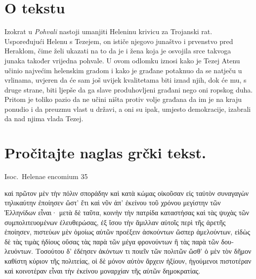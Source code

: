 


\section*{O tekstu}

Izokrat u \textit{Pohvali} nastoji umanjiti Heleninu krivicu za Trojanski rat. Uspoređujući Helenu s Tezejem, on ističe njegovo junaštvo i prvenstvo pred Heraklom, čime želi ukazati na to da je i žena koja je osvojila srce takvoga junaka također vrijedna pohvale. U ovom odlomku iznosi kako je Tezej Atenu učinio najvećim helenskim gradom i kako je građane potaknuo da se natječu u vrlinama, uvjeren da će sam još uvijek kvalitetama biti iznad njih, dok će mu, s druge strane, biti ljepše da ga slave produhovljeni građani nego oni ropskog duha. Pritom je toliko pazio da ne učini ništa protiv volje građana da im je na kraju  ponudio i da preuzmu vlast u državi, a oni su ipak, umjesto demokracije, izabrali da nad njima vlada Tezej.


\section*{Pročitajte naglas grčki tekst.}

Isoc.\ Helenae encomium 35


\medskip

\begin{greek}
{\large

\noindent καὶ πρῶτον μὲν τὴν πόλιν σποράδην καὶ κατὰ κώμας οἰκοῦσαν εἰς ταὐτὸν συναγαγὼν τηλικαύτην ἐποίησεν ὥστ' ἔτι καὶ νῦν ἀπ' ἐκείνου τοῦ χρόνου μεγίστην τῶν Ἑλληνίδων εἶναι· μετὰ δὲ ταῦτα, κοινὴν τὴν πατρίδα καταστήσας καὶ τὰς ψυχὰς τῶν συμπολιτευομένων ἐλευθερώσας, ἐξ ἴσου τὴν ἅμιλλαν αὐτοῖς περὶ τῆς ἀρετῆς ἐποίησεν, πιστεύων μὲν ὁμοίως αὐτῶν προέξειν ἀσκούντων ὥσπερ ἀμελούντων, εἰδὼς δὲ τὰς τιμὰς ἡδίους οὔσας τὰς παρὰ τῶν μέγα φρονούντων ἢ τὰς παρὰ τῶν δουλευόντων. Τοσούτου δ' ἐδέησεν ἀκόντων τι ποιεῖν τῶν πολιτῶν ὥσθ' ὁ μὲν τὸν δῆμον καθίστη κύριον τῆς πολιτείας, οἱ δὲ μόνον αὐτὸν ἄρχειν ἠξίουν, ἡγούμενοι πιστοτέραν καὶ κοινοτέραν εἶναι τὴν ἐκείνου μοναρχίαν τῆς αὑτῶν δημοκρατίας.


}
\end{greek}

